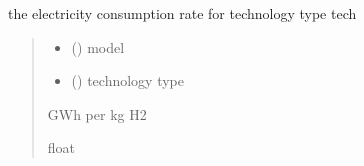 \documentclass[letterpaper,10pt,english]{sphinxmanual}
\begin{document}
\begin{fulllineitems}
\label{\detokenize{src.models.hydrogen.utilities.h2_functions:src.models.hydrogen.utilities.h2_functions.get_electricity_consumption_rate}}
\pysigstartsignatures
\pysiglinewithargsret
{}
{\sphinxparamcomma {}}
{}
\pysigstopsignatures
\sphinxAtStartPar
the electricity consumption rate for technology type tech
\begin{quote}\begin{description}
\begin{itemize}
\item {} 
\sphinxAtStartPar
{} ({\hyperref[\detokenize{src.models.hydrogen.model.h2_model:src.models.hydrogen.model.h2_model.H2Model}]{}}) \textendash{} model

\item {} 
\sphinxAtStartPar
{} () \textendash{} technology type

\end{itemize}

\sphinxAtStartPar
GWh per kg H2

\sphinxAtStartPar
float

\end{description}\end{quote}

\end{fulllineitems}

\end{document}
